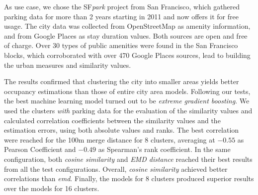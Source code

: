 As use case, we chose the SF\textit{park} project from San Francisco, which gathered parking data for more than 2 years starting in 2011 and now offers it for free usage.
The city data was collected from OpenStreetMap as amenity information, and from Google Places as stay duration values.
Both sources are open and free of charge.
Over 30 types of public amenities were found in the San Francisco blocks, which corroborated with over 470 Google Places sources, lead to building the urban measures and similarity values. 

The results confirmed that clustering the city into smaller areas yields better occupancy estimations than those of entire city area models.
Following our tests, the best machine learning model turned out to be \textit{extreme gradient boosting}.
We used the clusters \textit{with} parking data for the evaluation of the similarity values and calculated correlation coefficients between the similarity values and the estimation errors, using both absolute values and ranks.
The best correlation were reached for the 100m merge distance for 8 clusters, averaging at $-0.55$ as Pearson Coefficient and $-0.49$ as Spearman's rank coefficient.
In the same configuration, both \textit{cosine similarity} and \textit{EMD distance} reached their best results from all the test configurations.
Overall, \textit{cosine similarity} achieved better correlations than \textit{emd}.
Finally, the models for 8 clusters produced superior results over the models for 16 clusters. 


%
	

